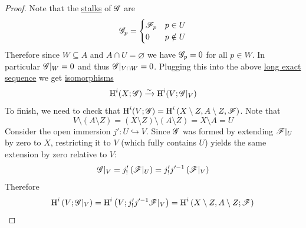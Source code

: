 \documentclass[../../main]{subfiles}
\begin{document}
\begin{proof}
  Note that the \hyperref[def:stalk]{stalks} of \(\mathscr{G}\) are
  \begin{equation*}
    \mathscr{G}_{p} = \begin{cases}
      \mathscr{F}_{p} & p \in U \\
      0 & p \notin U
    \end{cases}
  \end{equation*}
  Therefore since \(W \subseteq A\) and \(A \cap U = \varnothing\) we have \(\mathscr{G}_{p} = 0\) for all \(p \in W\).
  In particular \(\mathscr{G}|_{W} = 0\) and thus \(\mathscr{G}|_{V \cap W} = 0\).
  Plugging this into the above \hyperref[def:long-exact-sequence]{long exact sequence} we get \hyperref[def:categorical-isomorphism]{isomorphisms}
  \begin{equation*}
    \operatorname{H}^{i}(X; \mathscr{G}) \xrightarrow{\sim} \operatorname{H}^{i}(V; \mathscr{G}|_{V})
  \end{equation*}
  To finish, we need to check that \(\operatorname{H}^{i}(V; \mathscr{G}) = \operatorname{H}^{i} \left( X \setminus Z, A \setminus Z, \mathscr{F} \right)\).
  Note that
  \begin{equation*}
    V \setminus ( A \setminus Z ) = \left( X \setminus Z \right) \setminus \left( A \setminus Z \right) = X \setminus A = U
  \end{equation*}
  Consider the open immersion \(j'\colon U \hookrightarrow V\).
  Since \(\mathscr{G}\) was formed by extending \(\mathscr{F}|_{U}\) by zero to \(X\), restricting it to \(V\) (which fully contains \(U\)) yields the same extension by zero relative to \(V\):
  \begin{equation*}
    \mathscr{G}|_{V} = j'_{!} \left( \mathscr{F}|_{U} \right) = j'_{!} j'^{-1} \left( \mathscr{F}|_{V} \right)
  \end{equation*}
  Therefore
  \begin{equation*}
    \operatorname{H}^{i} \left( V; \mathscr{G}|_{V} \right) = \operatorname{H}^{i} \left( V; j'_{!}j'^{-1}\mathscr{F}|_{V} \right) = \operatorname{H}^{i} \left( X \setminus Z, A \setminus Z; \mathscr{F} \right) \qedhere
  \end{equation*}
\end{proof}
\end{document}
